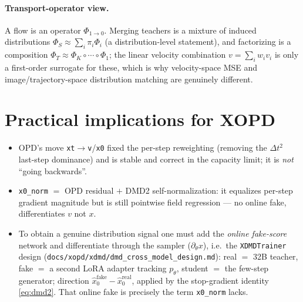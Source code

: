 \documentclass[11pt,a4paper]{article}
\newcommand{\xh}{\hat{x}_0}
\newcommand{\real}{\mathrm{real}}
\newcommand{\fake}{\mathrm{fake}}
\begin{document}
\paragraph{Transport-operator view.} A flow is an operator $\Phi_{1\to0}$. Merging teachers is a
mixture of induced distributions $\Phi_S\approx\sum_i\pi_i\Phi_i$ (a distribution-level statement),
and factorizing is a composition $\Phi_T\approx\Phi_K\circ\cdots\circ\Phi_1$; the linear
velocity combination $v=\sum_i w_i v_i$ is only a first-order surrogate for these, which is why
velocity-space MSE and image/trajectory-space distribution matching are genuinely different.

\section{Practical implications for XOPD}
\begin{itemize}[leftmargin=1.4em]
\item OPD's move \texttt{xt}$\to$\texttt{v}/\texttt{x0} fixed the per-step reweighting (removing the
$\Delta t^2$ last-step dominance) and is stable and correct in the capacity limit; it is
\emph{not} ``going backwards''.
\item \texttt{x0\_norm} $=$ OPD residual $+$ DMD2 self-normalization: it equalizes per-step gradient
magnitude but is still pointwise field regression --- no online fake, differentiates $v$ not $x$.
\item To obtain a genuine distribution signal one must add the \emph{online fake-score} network and
differentiate through the sampler ($\partial_\theta x$), i.e.\ the \texttt{XDMDTrainer} design
(\texttt{docs/xopd/xdmd/dmd\_cross\_model\_design.md}): real $=$ 32B teacher, fake $=$ a second LoRA
adapter tracking $p_\theta$, student $=$ the few-step generator; direction
$\xh^{\fake}-\xh^{\real}$, applied by the stop-gradient identity \eqref{eq:dmd2}. That online fake
is precisely the term \texttt{x0\_norm} lacks.
\end{itemize}
\end{document}

